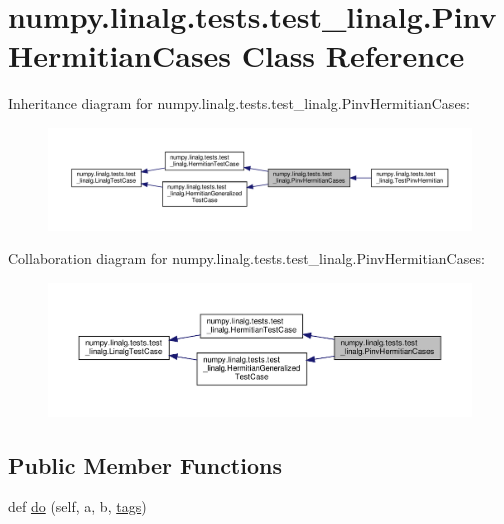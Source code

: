 \hypertarget{classnumpy_1_1linalg_1_1tests_1_1test__linalg_1_1PinvHermitianCases}{}\section{numpy.\+linalg.\+tests.\+test\+\_\+linalg.\+Pinv\+Hermitian\+Cases Class Reference}
\label{classnumpy_1_1linalg_1_1tests_1_1test__linalg_1_1PinvHermitianCases}


Inheritance diagram for numpy.\+linalg.\+tests.\+test\+\_\+linalg.\+Pinv\+Hermitian\+Cases\+:
\nopagebreak
\begin{figure}[H]
\begin{center}
\leavevmode
\includegraphics[width=350pt]{classnumpy_1_1linalg_1_1tests_1_1test__linalg_1_1PinvHermitianCases__inherit__graph}
\end{center}
\end{figure}


Collaboration diagram for numpy.\+linalg.\+tests.\+test\+\_\+linalg.\+Pinv\+Hermitian\+Cases\+:
\nopagebreak
\begin{figure}[H]
\begin{center}
\leavevmode
\includegraphics[width=350pt]{classnumpy_1_1linalg_1_1tests_1_1test__linalg_1_1PinvHermitianCases__coll__graph}
\end{center}
\end{figure}
\subsection*{Public Member Functions}
\begin{DoxyCompactItemize}
\item 
def \hyperlink{classnumpy_1_1linalg_1_1tests_1_1test__linalg_1_1PinvHermitianCases_afb0a02f6c480038c6df8a18af03ef9bd}{do} (self, a, b, \hyperlink{namespacenumpy_1_1linalg_1_1tests_1_1test__linalg_ac6a064918e74d701a7b5aac0ffefe1e7}{tags})
\end{DoxyCompactItemize}
